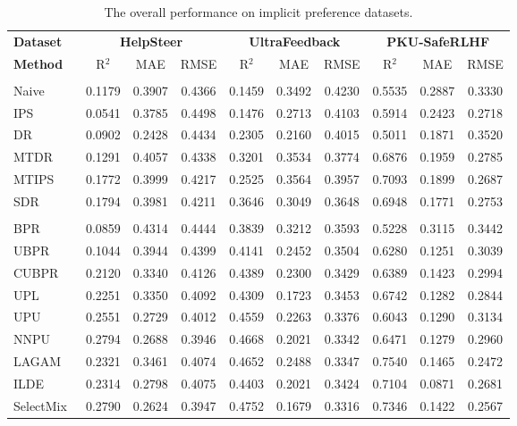 \documentclass[]{arxiv_singlecolumn}
\theoremstyle{plain}
\theoremstyle{definition}
\theoremstyle{remark}
\begin{document}
\begin{table}[t]
\centering
\caption{The overall performance on implicit preference datasets.}
\label{tab:main_result}
\renewcommand{\arraystretch}{1.0}
\setlength\tabcolsep{9.5pt}
\scriptsize
\begin{tabular}{lccccccccc}
\toprule
\textbf{Dataset} 
  & \multicolumn{3}{c}{\textbf{HelpSteer}} 
  & \multicolumn{3}{c}{\textbf{UltraFeedback}} 
  & \multicolumn{3}{c}{\textbf{PKU-SafeRLHF}} \\
\cmidrule(lr){2-4} \cmidrule(lr){5-7} \cmidrule(lr){8-10}
\textbf{Method} 
  & R$^2$ & MAE & RMSE
  & R$^2$ & MAE & RMSE
  & R$^2$ & MAE & RMSE \\
\midrule

\rowcolor[HTML]{f0f0f0}
\multicolumn{10}{l}{\textit{\textbf{Debiased learning methods}}} \\
Naive   & 0.1179 & 0.3907 & 0.4366 & 0.1459 & 0.3492 & 0.4230 & 0.5535 & 0.2887 & 0.3330 \\
IPS~\citep{ips}     & 0.0541 & 0.3785 & 0.4498 & 0.1476 & 0.2713 & 0.4103 & 0.5914 & 0.2423 & 0.2718 \\
DR~\citep{dr}      & 0.0902 & 0.2428 & 0.4434 & 0.2305 & 0.2160 & 0.4015 & 0.5011 & 0.1871 & 0.3520 \\
MTDR~\citep{mtlips}    & 0.1291 & 0.4057 & 0.4338 & 0.3201 & 0.3534 & 0.3774 & 0.6876 & 0.1959 & 0.2785 \\
MTIPS~\citep{mtlips}   & 0.1772 & 0.3999 & 0.4217 & 0.2525 & 0.3564 & 0.3957 & 0.7093 & 0.1899 & 0.2687 \\
SDR~\citep{li2023stabledr}    & 0.1794 & 0.3981 & 0.4211 & 0.3646 & 0.3049 & 0.3648 & 0.6948 & 0.1771 & 0.2753 \\

\hdashline

\rowcolor[HTML]{f0f0f0}
\multicolumn{10}{l}{\textit{\textbf{PU learning methods}}} \\
BPR~\citep{bpr}     & 0.0859 & 0.4314 & 0.4444 & 0.3839 & 0.3212 & 0.3593 & 0.5228 & 0.3115 & 0.3442 \\
UBPR~\citep{ubpr}    & 0.1044 & 0.3944 & 0.4399 & 0.4141 & 0.2452 & 0.3504 & 0.6280 & 0.1251 & 0.3039 \\
CUBPR~\citep{ubpr}   & 0.2120 & 0.3340 & 0.4126 & 0.4389 & 0.2300 & 0.3429 & 0.6389 & 0.1423 & 0.2994 \\
UPL~\citep{pure}    & 0.2251 & 0.3350 & 0.4092 & 0.4309 & 0.1723 & 0.3453 & 0.6742 & 0.1282 & 0.2844 \\
UPU~\citep{upu}     & 0.2551 & 0.2729 & 0.4012 & 0.4559 & 0.2263 & 0.3376 & 0.6043 & 0.1290 & 0.3134 \\
NNPU~\citep{nnpu}    & 0.2794 & 0.2688 & 0.3946 & 0.4668 & 0.2021 & 0.3342 & 0.6471 & 0.1279 & 0.2960 \\
LAGAM~\citep{lagam}   & 0.2321 & 0.3461 & 0.4074 & 0.4652 & 0.2488 & 0.3347 & 0.7540 & 0.1465 & 0.2472 \\
ILDE~\citep{ilde}    & 0.2314 & 0.2798 & 0.4075 & 0.4403 & 0.2021 & 0.3424 & 0.7104 & 0.0871 & 0.2681 \\
SelectMix~\citep{selectmix}  & 0.2790 & 0.2624 & 0.3947 & 0.4752 & 0.1679 & 0.3316 & 0.7346 & 0.1422 & 0.2567 \\


\end{tabular}
\end{table}
\end{document}
